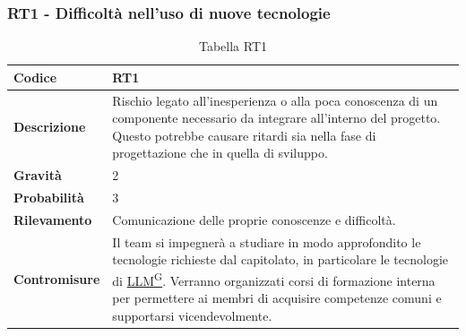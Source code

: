\documentclass{article}
\begin{document}
    \subsubsection{RT1 - Difficoltà	 nell’uso	di nuove tecnologie}
    \begin{table}[H]
        \renewcommand{\arraystretch}{1.5}
        \centering
        \begin{tabular}{|p{3cm}|p{11cm}|}
            \hline
            \textbf{Codice} & RT1 \\
            \hline
            \textbf{Descrizione} & Rischio legato all’inesperienza o alla poca conoscenza di un componente necessario da integrare all’interno del progetto. Questo potrebbe causare ritardi sia nella fase di progettazione che in quella di sviluppo. \\
            \hline
            \textbf{Gravità} & 2 \\
            \hline
            \textbf{Probabilità} & 3 \\
            \hline
            \textbf{Rilevamento} & Comunicazione delle proprie conoscenze e difficoltà. \\
            \hline
            \textbf{Contromisure} & Il team si impegnerà a studiare in modo approfondito le tecnologie richieste dal capitolato, in particolare le tecnologie di \href{https://code7crusaders.github.io/docs/RTB/documentazione_interna/glossario.html#llm-large-language-model}{LLM\textsuperscript{G}}. Verranno organizzati corsi di formazione interna per permettere ai membri di acquisire competenze comuni e supportarsi vicendevolmente. \\
            \hline
        \end{tabular}
        \caption{Tabella RT1}
    \end{table}
\end{document}
